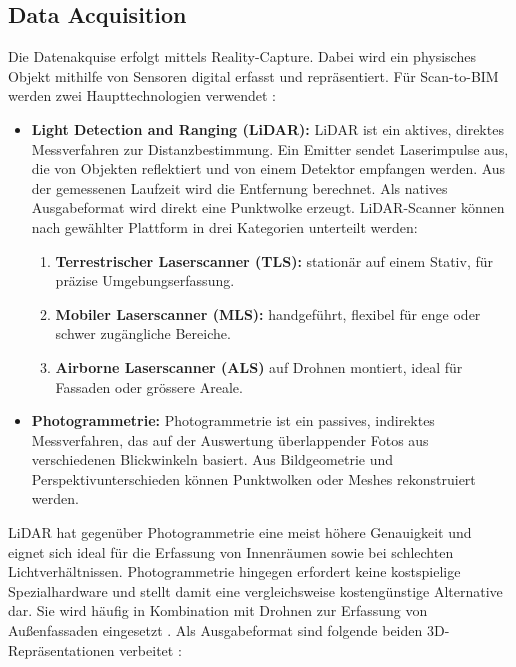 \subsection{Data Acquisition}
\begin{German}
    Die Datenakquise erfolgt mittels Reality-Capture. Dabei wird ein physisches Objekt mithilfe von Sensoren digital erfasst und repräsentiert. Für Scan-to-BIM werden zwei Haupttechnologien verwendet \cite{rashdiScanningTechnologiesBuilding2022}:
    
    \begin{itemize}
        \item \textbf{Light Detection and Ranging (LiDAR):} LiDAR ist ein aktives, direktes Messverfahren zur Distanzbestimmung. Ein Emitter sendet Laserimpulse aus, die von Objekten reflektiert und von einem Detektor empfangen werden. Aus der gemessenen Laufzeit wird die Entfernung berechnet. Als natives Ausgabeformat wird direkt eine Punktwolke erzeugt. LiDAR-Scanner können nach gewählter Plattform in drei Kategorien unterteilt werden:
        \begin{enumerate}
            \item \textbf{Terrestrischer Laserscanner (TLS):} stationär auf einem Stativ, für präzise Umgebungserfassung.
            \item \textbf{Mobiler Laserscanner (MLS):} handgeführt, flexibel für enge oder schwer zugängliche Bereiche.
            \item \textbf{Airborne Laserscanner (ALS)} auf Drohnen montiert, ideal für Fassaden oder grössere Areale.
        \end{enumerate}
        \item \textbf{Photogrammetrie:} Photogrammetrie ist ein passives, indirektes Messverfahren, das auf der Auswertung überlappender Fotos aus verschiedenen Blickwinkeln basiert. Aus Bildgeometrie und Perspektivunterschieden können Punktwolken oder Meshes rekonstruiert werden.
    \end{itemize}

    LiDAR hat gegenüber Photogrammetrie eine meist höhere Genauigkeit und eignet sich ideal für die Erfassung von Innenräumen sowie bei schlechten Lichtverhältnissen. Photogrammetrie hingegen erfordert keine kostspielige Spezialhardware und stellt damit eine vergleichsweise kostengünstige Alternative dar. Sie wird häufig in Kombination mit Drohnen zur Erfassung von Außenfassaden eingesetzt \cite{rashdiScanningTechnologiesBuilding2022}.
    Als Ausgabeformat sind folgende beiden 3D-Repräsentationen verbeitet \cite{borrusoProceduralPointCloud2023,liu3DPointCloud2021}:


\end{German}

